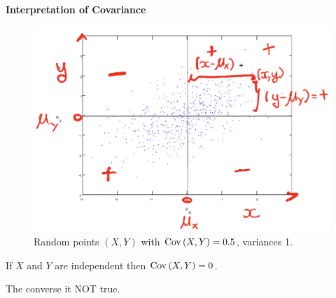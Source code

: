 \textbf{Interpretation of Covariance}

\begin{figure}[htbp]
    \center
    \includegraphics[scale=0.5]{img/cov.png}
    \caption{Random points $(X,Y)$ with $\operatorname{Cov}\left({X,Y}\right) = 0.5$, variances 1.}
\end{figure}


\begin{theorem}
    If $X$ and $Y$ are independent then $\operatorname{Cov}\left({X, Y}\right) = 0$.
\end{theorem}

\begin{note}
    The converse it NOT true.
\end{note}


